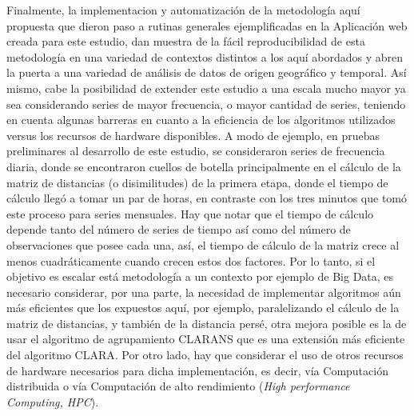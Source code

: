 \documentclass[12pt,oneside]{book}\usepackage[]{graphicx}\usepackage[]{color}
\theoremstyle{definition} %
\begin{document}


Finalmente, la implementacion y automatización de la metodología aquí propuesta que dieron paso a rutinas generales ejemplificadas en la Aplicación web creada para este estudio, dan muestra de la fácil reproducibilidad de esta metodología en una variedad de contextos distintos a los aquí abordados y abren la puerta a una variedad de análisis de datos de origen geográfico y temporal. 
Así mismo, cabe la posibilidad de extender este estudio a una escala mucho mayor ya sea considerando series de mayor frecuencia, o mayor cantidad de series, teniendo en cuenta algunas barreras en cuanto a la eficiencia de los algoritmos utilizados versus los recursos de hardware disponibles. A modo de ejemplo, en pruebas preliminares al desarrollo de este estudio, se consideraron series de frecuencia diaria, donde se encontraron cuellos de botella principalmente en el cálculo de la matriz de distancias (o disimilitudes) de la primera etapa, donde el tiempo de cálculo llegó a tomar un par de horas, en contraste con los tres minutos que tomó este proceso para series mensuales. Hay que notar que el tiempo de cálculo depende tanto del número de series de tiempo así como del número de observaciones que posee cada una, así, el tiempo de cálculo de la matriz crece al menos cuadráticamente cuando crecen estos dos factores. Por lo tanto, si el objetivo es escalar está metodología a un contexto por ejemplo de Big Data, es necesario considerar, por una parte, la necesidad de implementar algoritmos aún más eficientes que los expuestos aquí, por ejemplo, paralelizando el cálculo de la matriz de distancias, y también de la distancia persé, otra mejora posible es la de usar el algoritmo de agrupamiento CLARANS que es una extensión más eficiente del algoritmo CLARA. Por otro lado, hay que considerar el uso de otros recursos de hardware necesarios para dicha implementación, es decir, vía Computación distribuida o vía Computación de alto rendimiento (\textit{High performance Computing, HPC}).


\end{document}
